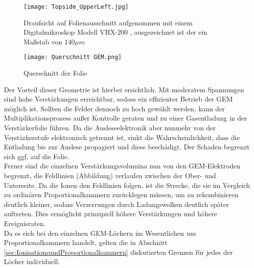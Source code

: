 	\begin{figure}[h]
		\centering
		\texttt{[image: Topside\_UpperLeft.jpg]}
		\caption{Draufsicht auf Folienausschnitt aufgenommen mit einem Digitalmikroskop Modell VHX-200 \cite{MikroskopReinraum}, ausgezeichnet ist der ein Maßstab von $140 \si{\mu m}$}
		\label{fig:Draufsicht}
	\end{figure}

	\begin{figure}[h]
		\centering
		\texttt{[image: Querschnitt GEM.png]}
		\caption{Querschnitt der Folie}
		\label{fig:Querschnitt}
	\end{figure}
		
		
\noindent Der Vorteil dieser Geometrie ist hierbei ersichtlich. Mit moderatem Spannungen sind hohe Verstärkungen erreichtbar, sodass ein effizienter Betrieb der GEM möglich ist. Sollten die Felder dennoch zu hoch gewählt werden, kann der Multiplikationsprozess außer Kontrolle geraten und zu einer Gasentladung in der Verstärkerfolie führen. Da die Ausleseelektronik aber nunmehr von der Verstärkerstufe elektronisch getrennt ist, sinkt die Wahrscheinlichkeit, dass die Entladung bis zur Auslese propagiert und diese beschädigt. Der Schaden begrenzt sich ggf. auf die Folie.\\
Ferner sind die einzelnen Verstärkungsvolumina nun von den GEM-Elektroden begrenzt, die Feldlinien (Abbildung) verlaufen zwischen der Ober- und Unterseite. Da die Ionen den Feldlinien folgen, ist die Strecke, die sie im Vergleich zu ordinären Proportionalkammern zurücklegen müssen, um zu rekombinieren deutlich kleiner, sodass Verzerrungen durch Ladungswolken deutlich später auftreten. Dies ermöglicht prinzipiell höhere Verstärkungen und höhere Ereignisraten. 		
\\
Da es sich bei den einzelnen GEM-Löchern im Wesentlichen um Proportionalkammern handelt, gelten die in Abschnitt \ref{sec:IonisationsundProportionalkammern} diskutierten Grenzen für jedes der Löcher individuell.
			



